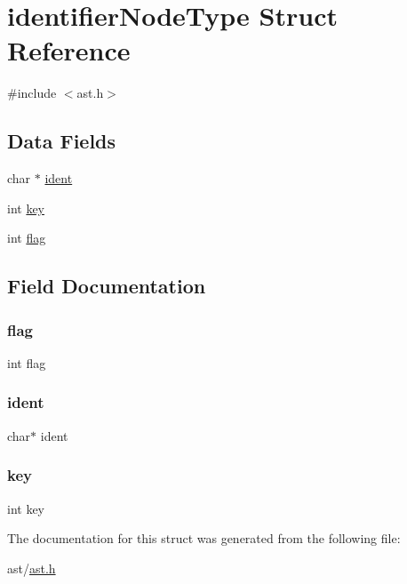 \hypertarget{structidentifier_node_type}{}\section{identifier\+Node\+Type Struct Reference}
\label{structidentifier_node_type}


{\ttfamily \#include $<$ast.\+h$>$}

\subsection*{Data Fields}
\begin{DoxyCompactItemize}
\item 
char $\ast$ \hyperlink{structidentifier_node_type_a25164f805d9af841d8063fe86f5e1da4}{ident}
\item 
int \hyperlink{structidentifier_node_type_a35af0be900467fedbb610bd6ea65ed78}{key}
\item 
int \hyperlink{structidentifier_node_type_adf916204820072417ed73a32de1cefcf}{flag}
\end{DoxyCompactItemize}


\subsection{Field Documentation}
\mbox{\label{structidentifier_node_type_adf916204820072417ed73a32de1cefcf}} 
\subsubsection{\texorpdfstring{flag}{flag}}
{\footnotesize\ttfamily int flag}

\mbox{\label{structidentifier_node_type_a25164f805d9af841d8063fe86f5e1da4}} 
\subsubsection{\texorpdfstring{ident}{ident}}
{\footnotesize\ttfamily char$\ast$ ident}

\mbox{\label{structidentifier_node_type_a35af0be900467fedbb610bd6ea65ed78}} 
\subsubsection{\texorpdfstring{key}{key}}
{\footnotesize\ttfamily int key}



The documentation for this struct was generated from the following file\+:\begin{DoxyCompactItemize}
\item 
ast/\hyperlink{ast_8h}{ast.\+h}\end{DoxyCompactItemize}
